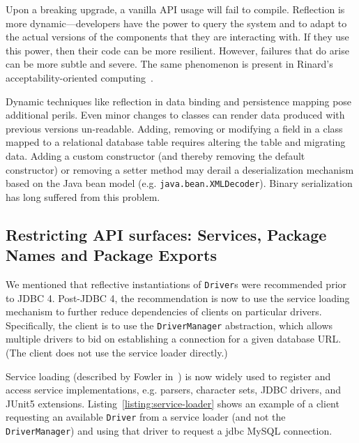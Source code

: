 Upon a breaking upgrade, a vanilla API usage will fail to compile. Reflection is more dynamic---developers have the power to query the system and to adapt to the actual versions of the components that they are interacting with. If they use this power, then their code can be more resilient. However, failures that do arise can be more subtle and severe. The same phenomenon is present in Rinard's acceptability-oriented computing~\cite{rinard03:_accep}.

Dynamic techniques like reflection in data binding and persistence mapping pose additional perils. Even minor changes to classes can render data produced with previous versions un-readable. Adding, removing or modifying a field in a class mapped to a relational database table requires altering the table and migrating data. Adding a custom constructor (and thereby removing the default constructor) or removing a setter method may derail a deserialization mechanism based on the Java bean model (e.g. \texttt{java.bean.XMLDecoder}). Binary serialization has long suffered from this problem. 

\subsection{Restricting API surfaces: Services, Package Names and Package Exports}
We mentioned that reflective instantiations of \texttt{Driver}s were recommended prior to JDBC 4. Post-JDBC 4, the recommendation is now to use the service loading mechanism to further reduce dependencies of clients on particular drivers. Specifically, the client is to use the \texttt{DriverManager} abstraction, which allows multiple drivers to bid on establishing a connection for a given database URL. (The client does not use the service loader directly.) 



Service loading (described by Fowler in~\cite{fowler04:_inver_contr_contain_depen_injec}) is now widely used to register and access service implementations, e.g. parsers, character sets, JDBC drivers, and JUnit5 extensions. 
Listing~\ref{listing:service-loader} shows an example of a client requesting an available \texttt{Driver} from a service loader (and not the {\tt DriverManager}) and using that driver to request a jdbc MySQL connection.

